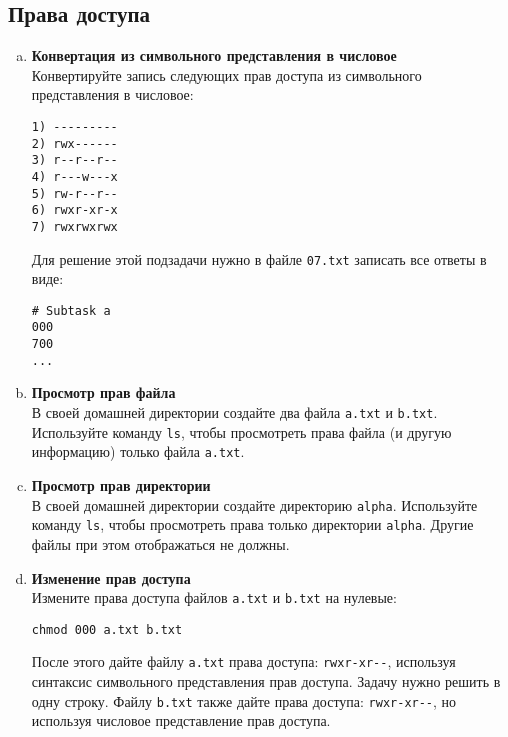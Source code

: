 \documentclass{article}
\begin{document}
\subsection{Права доступа}
\begin{enumerate}[a.]
\item \textbf{Конвертация из символьного представления в числовое}\\
Конвертируйте запись следующих прав доступа из символьного представления в числовое:
\begin{lstlisting}
1) ---------
2) rwx------
3) r--r--r--
4) r---w---x
5) rw-r--r--
6) rwxr-xr-x
7) rwxrwxrwx
\end{lstlisting}
Для решение этой подзадачи нужно в файле \texttt{07.txt} записать все ответы в виде:
\begin{lstlisting}
# Subtask a
000
700
...
\end{lstlisting}

\item \textbf{Просмотр прав файла}\\
В своей домашней директории создайте два файла \texttt{a.txt} и \texttt{b.txt}. Используйте команду \texttt{ls}, чтобы просмотреть права файла (и другую информацию) только файла \texttt{a.txt}.

\item \textbf{Просмотр прав директории}\\
В своей домашней директории создайте директорию \texttt{alpha}. Используйте команду \texttt{ls}, чтобы просмотреть права только директории \texttt{alpha}. Другие файлы при этом отображаться не должны.


\item \textbf{Изменение прав доступа}\\
Измените права доступа файлов \texttt{a.txt} и \texttt{b.txt} на нулевые:
\begin{lstlisting}
chmod 000 a.txt b.txt
\end{lstlisting}
После этого дайте файлу \texttt{a.txt} права доступа: \texttt{rwxr-xr-{}-}, используя синтаксис символьного представления прав доступа. Задачу нужно решить в одну строку.
Файлу \texttt{b.txt} также дайте права доступа: \texttt{rwxr-xr-{}-}, но используя числовое представление прав доступа. 


\end{enumerate}
\end{document}
